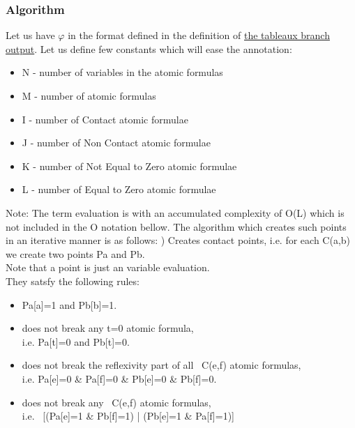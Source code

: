 \documentclass{article}
\begin{document}
			\subsubsection{Algorithm}
			Let us have $\varphi$ in the format defined in the definition of \hyperref[tableaux:branch:output]{the tableaux branch output}. %
			Let us define few constants which will ease the annotation:
			\begin{itemize}
				\item N - number of variables in the atomic formulas
				\item M - number of atomic formulas
				\item I - number of Contact atomic formulae
				\item J - number of Non Contact atomic formulae
				\item K - number of Not Equal to Zero atomic formulae
				\item L - number of Equal to Zero atomic formulae
			\end{itemize}
			
			Note: The term evaluation is with an accumulated complexity of O(L) which is not included in the O notation bellow.
			\newline
			\newline
			The algorithm which creates such points in an iterative manner is as follows:
			) Creates contact points, i.e. for each C(a,b) we create two points Pa and Pb.  \\
				Note that a point is just an variable evaluation. \\
				They satsfy the following rules: 
				\begin{itemize}
					\item Pa[a]=1 and Pb[b]=1.
					\item does not break any t=0 atomic formula, \\
						i.e. Pa[t]=0 and Pb[t]=0.
					\item does not break the reflexivity part of all ~C(e,f) atomic formulas, \\
						i.e. Pa[e]=0 \& Pa[f]=0 \& Pb[e]=0 \& Pb[f]=0.
					\item does not break any ~C(e,f) atomic formulas, \\
						i.e. ~[(Pa[e]=1 \& Pb[f]=1) | (Pb[e]=1 \& Pa[f]=1)]
				\end{itemize}
				
\end{document}
